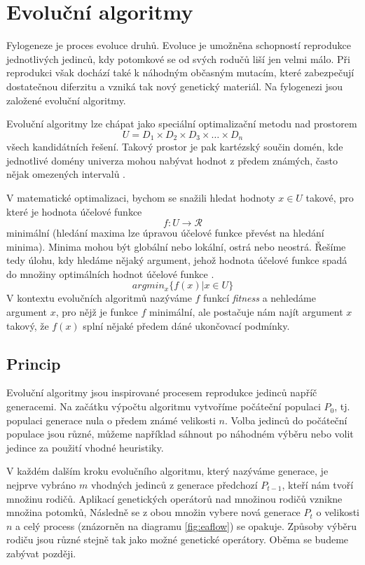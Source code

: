 \section{Evoluční algoritmy}

Fylogeneze je proces evoluce druhů. Evoluce je umožněna schopností reprodukce jednotlivých
jedinců, kdy potomkové se od svých rodučů liší jen velmi málo. Při reprodukci však dochází také
k náhodným občasným mutacím, které zabezpečují dostatečnou diferzitu a vzniká tak nový
genetický materiál. Na fylogenezi jsou založené evoluční algoritmy. 

Evoluční algoritmy lze chápat jako speciální optimalizační metodu nad prostorem 
$$U = D_{1} \times D_{2} \times D_{3} \times \ldots \times D_{n}$$
všech kandidátních řešení. Takový prostor je pak kartézský součin domén, kde
jednotlivé domény univerza mohou nabývat
hodnot z předem známých, často nějak omezených intervalů \cite{evolution_hardware}.  

V matematické optimalizaci, bychom se snažili hledat hodnoty $x \in U$ takové,
pro které je hodnota účelové funkce
$$ f : U \to \mathcal{R} $$
minimální (hledání maxima lze úpravou účelové funkce převést na hledání minima).
Minima mohou být globální nebo lokální, ostrá nebo neostrá. Řešíme tedy úlohu,
kdy hledáme nějaký argument, jehož hodnota účelové funkce spadá do množiny optimálních
hodnot účelové funkce \cite{nlprog}.
$$ argmin_{x}\{f(x)|x \in U\} $$		
V kontextu evolučních algoritmů nazýváme $f$ funkcí \textit{fitness} a nehledáme 
argument $x$, pro nějž je funkce $f$ minimální, ale postačuje nám najít argument $x$ 
takový, že $f(x)$ splní nějaké předem dáné ukončovací podmínky.

\subsection{Princip}
Evoluční algoritmy jsou inspirované procesem reprodukce jedinců napříč generacemi.
Na začátku výpočtu algoritmu vytvoříme počáteční populaci $P_{0}$, tj.
populaci generace nula o předem známé velikosti $n$.
Volba jedinců do počáteční populace jsou různé, můžeme například sáhnout po náhodném 
výběru nebo volit jedince za použití vhodné heuristiky.


V každém dalším kroku evolučního algoritmu, který nazýváme generace, je nejprve vybráno
$m$ vhodných jedinců z generace předchozí $P_{t - 1}$, kteří nám tvoří množinu rodičů. Aplikací
genetických operátorů nad množinou rodičů vznikne množina potomků, Následně se z obou
množin vybere nová generace $P_{t}$ o velikosti $n$ a celý process (znázorněn na diagramu \ref{fig:eaflow})
se opakuje. Způsoby výběru rodiču jsou různé stejně
tak jako možné genetické operátory. Oběma se budeme zabývat později.

